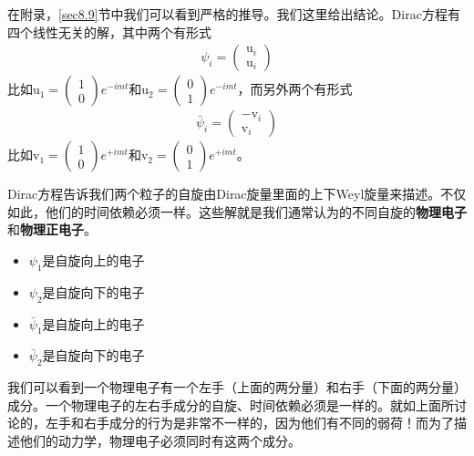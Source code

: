 在附录，\ref{sec8.9}节中我们可以看到严格的推导。我们这里给出结论。Dirac方程有四个线性无关的解，其中两个有形式
\begin{align}
\psi_i=\left(\begin{matrix}\text{u}_i\\\text{u}_i\end{matrix}\right)
\end{align}
比如$\text{u}_1=\left(\begin{matrix}1\\0\end{matrix}\right)e^{-imt}$和$\text{u}_2=\left(\begin{matrix}0\\1\end{matrix}\right)e^{-imt}$，而另外两个有形式
\begin{align}
\bar{\psi}_i=\left(\begin{matrix}-\text{v}_i\\\text{v}_i\end{matrix}\right)
\end{align}
比如$\text{v}_1=\left(\begin{matrix}1\\0\end{matrix}\right)e^{+imt}$和$\text{v}_2=\left(\begin{matrix}0\\1\end{matrix}\right)e^{+imt}$。

Dirac方程告诉我们两个粒子的自旋由Dirac旋量里面的上下Weyl旋量来描述。不仅如此，他们的时间依赖必须一样。这些解就是我们通常认为的不同自旋的{\bf 物理电子}和{\bf 物理正电子}。

\begin{itemize}
\item $\psi_1$是自旋向上的电子
\item $\psi_2$是自旋向下的电子
\item $\bar{\psi}_1$是自旋向上的电子
\item $\bar{\psi}_2$是自旋向下的电子
\end{itemize}

我们可以看到一个物理电子有一个左手（上面的两分量）和右手（下面的两分量）成分。一个物理电子的左右手成分的自旋、时间依赖必须是一样的。就如上面所讨论的，左手和右手成分的行为是非常不一样的，因为他们有不同的弱荷！而为了描述他们的动力学，物理电子必须同时有这两个成分。

